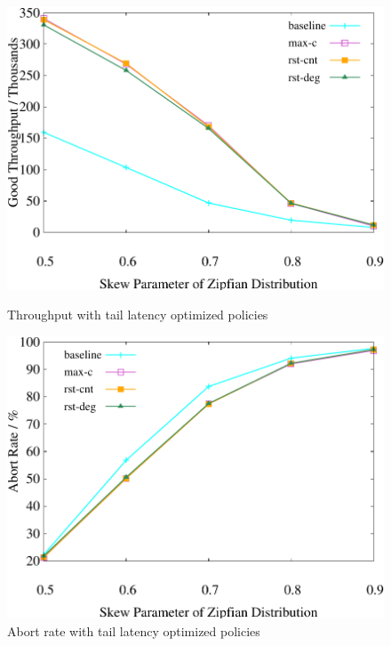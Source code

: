 \begin{figure}[t]
    \centering
    \begin{minipage}[b]{0.32\linewidth}
        \centering
        \includegraphics[width=\textwidth]{./exp_fig/restart/tps}
        \vspace{-2em}
        \caption{Throughput with tail latency optimized policies}
        \label{fig:restart:tps}
    \end{minipage}
    \begin{minipage}[b]{0.32\linewidth}
        \centering
        \includegraphics[width=\textwidth]{./exp_fig/restart/abort}
        \vspace{-2em}
        \caption{Abort rate with tail latency optimized policies}

\end{minipage}
\end{figure}
